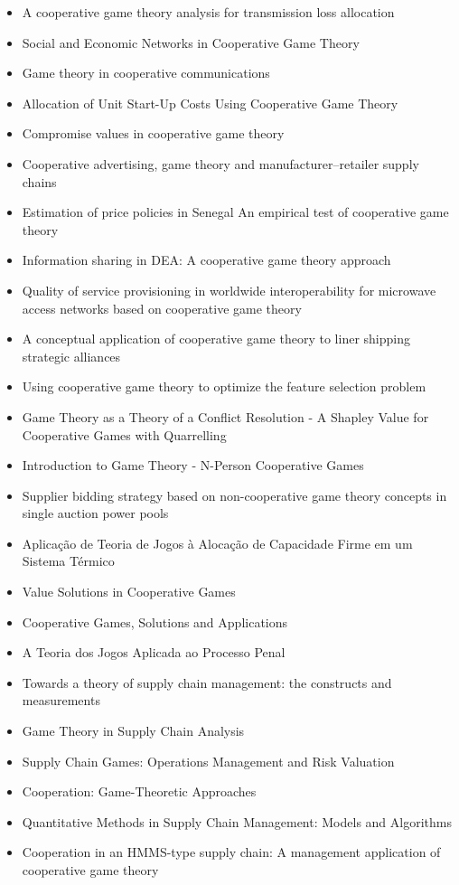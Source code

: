 \documentclass[
	article,			        %
	11pt,				          %
	oneside,			        %
	a4paper,			        %
	english,			        %
	brazil,				        %
	sumario=tradicional
]{abntex2}\usepackage[]{graphicx}\usepackage[]{color}
\begin{document}
\begin{itemize}
    \item A cooperative game theory analysis for transmission loss allocation \cite{Lima.2008}
    \item Social and Economic Networks in Cooperative Game Theory \cite{Ray.2002}
    \item Game theory in cooperative communications \cite{Yang.2012}
    \item Allocation of Unit Start-Up Costs Using Cooperative Game Theory \cite{Hu.2006}
    \item Compromise values in cooperative game theory \cite{Tijs.1993}
    \item Cooperative advertising, game theory and manufacturer--retailer supply chains \cite{Xie.2006}
    \item Estimation of price policies in Senegal An empirical test of cooperative game theory \cite{Beghin.1991}
    \item Information sharing in DEA: A cooperative game theory approach \cite{Lozano.2012}
    \item Quality of service provisioning in worldwide interoperability for microwave access networks based on cooperative game theory \cite{Jiao.2011}
    \item A conceptual application of cooperative game theory to liner shipping strategic alliances \cite{Song.2002}
    \item Using cooperative game theory to optimize the feature selection problem \cite{Sun.2012}
    \item Game Theory as a Theory of a Conflict Resolution - A Shapley Value for Cooperative Games with Quarrelling \cite{Rapoport.1974}
    \item Introduction to Game Theory - N-Person Cooperative Games \cite{Morris.1994}    
    \item Supplier bidding strategy based on non-cooperative game theory concepts in single auction power pools \cite{Kang.2007}
    \item Aplicação de Teoria de Jogos à Alocação de Capacidade Firme em um Sistema Térmico \cite{Ayala.2008}
    \item Value Solutions in Cooperative Games \cite{Mccain.2013} 
    \item Cooperative Games, Solutions and Applications \cite{Driessen.2013}
    \item A Teoria dos Jogos Aplicada ao Processo Penal \cite{Rosa.2014}
    \item Towards a theory of supply chain management: the constructs and measurements \cite{Chen.2004}
    \item Game Theory in Supply Chain Analysis \cite{Cachon.2004}
    \item Supply Chain Games: Operations Management and Risk Valuation \cite{kogan.2007}
    \item Cooperation: Game-Theoretic Approaches \cite{Hart.2012}
    \item Quantitative Methods in Supply Chain Management: Models and Algorithms \cite{Christou.2012}
    \item Cooperation in an HMMS-type supply chain: A management application of cooperative game theory \cite{Dobos.2010b}
  \end{itemize}
\end{document}
